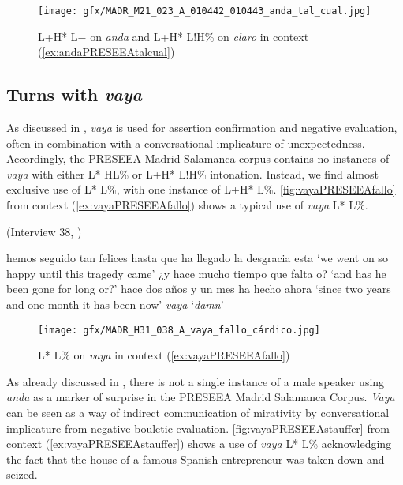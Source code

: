 \begin{figure}
	\texttt{[image: gfx/MADR\_M21\_023\_A\_010442\_010443\_anda\_tal\_cual.jpg]}
	\caption[L+H* L$-$ on \textit{anda} and L+H* L!H\% on \textit{claro} in context (\ref{ex:andaPRESEEAtalcual})]{L+H* L$-$ on \textit{anda} and L+H* L!H\% on \textit{claro} in context (\ref{ex:andaPRESEEAtalcual}) \href{https://osf.io/c4zrk/}{\faVolumeUp} \label{fig:andaPRESEEAtalcual}}
\end{figure}


\subsection{Turns with \textit{vaya}}\label{ch:5.2.4}\largerpage

As discussed in , \textit{vaya} is used for assertion confirmation and negative evaluation, often in combination with a conversational implicature of unexpectedness. Accordingly, the PRESEEA Madrid Salamanca corpus contains no instances of \textit{vaya} with either L* HL\% or L+H* L!H\% intonation. Instead, we find almost exclusive use of L* L\%, with one instance of L+H* L\%. \autoref{fig:vayaPRESEEAfallo} from context (\ref{ex:vayaPRESEEAfallo}) shows a typical use of \textit{vaya} L* L\%.

\begin{exe}
	\ex (Interview 38, \cite{PRESEEA.20142020}) \label{ex:vayaPRESEEAfallo}
	\begin{xlist}[A:]
	  hemos seguido tan felices hasta que ha llegado la desgracia esta  
	\glt `we went on so happy until this tragedy came' 
	  ¿y hace mucho tiempo que falta o?  
	\glt `and has he been gone for long or?' 
	 hace dos años y un mes ha hecho ahora  
	\glt `since two years and one month it has been now' 
	 \textit{vaya}  
	\glt `\textit{damn}'
	\end{xlist}
\end{exe}

\begin{figure}
	\texttt{[image: gfx/MADR\_H31\_038\_A\_vaya\_fallo\_cárdico.jpg]}
	\caption[L* L\% on \textit{vaya} in context (\ref{ex:vayaPRESEEAfallo})]{L* L\% on \textit{vaya} in context (\ref{ex:vayaPRESEEAfallo}) \href{https://osf.io/jzn9c/}{\faVolumeUp} \label{fig:vayaPRESEEAfallo}}
\end{figure}

As already discussed in , there is not a single instance of a male speaker using \textit{anda} as a marker of surprise in the PRESEEA Madrid Salamanca Corpus. \textit{Vaya} can be seen as a way of indirect communication of mirativity by conversational implicature from negative bouletic evaluation. \autoref{fig:vayaPRESEEAstauffer} from context (\ref{ex:vayaPRESEEAstauffer}) shows a use of \textit{vaya} L* L\% acknowledging the fact that the house of a famous Spanish entrepreneur was taken down and seized.\largerpage

